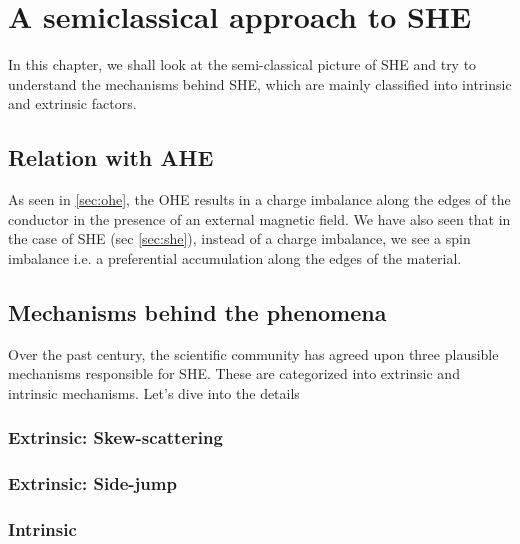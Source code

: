 \chapter{A semiclassical approach to SHE}

\label{chapter3}

In this chapter, we shall look at the semi-classical picture of SHE and try to understand the mechanisms behind SHE, which are mainly classified into intrinsic and extrinsic factors.

\section{Relation with AHE}

As seen in \cref{sec:ohe}, the OHE results in a charge imbalance along the edges of the conductor in the presence of an external magnetic field. We have also seen that in the case of SHE (sec \ref{sec:she}), instead of a charge imbalance, we see a spin imbalance i.e. a preferential accumulation along the edges of the material.




\section{Mechanisms behind the phenomena}

Over the past century, the scientific community has agreed upon three plausible mechanisms responsible for SHE. These are categorized into extrinsic and intrinsic mechanisms. Let's dive into the details

\subsection{Extrinsic: Skew-scattering}


\subsection{Extrinsic: Side-jump}

\subsection{Intrinsic}
